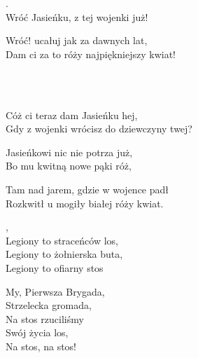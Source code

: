 \documentclass[a4paper,twoside,noinfo,nofrontmatter]{songbook}
\begin{document}
\begin{info}
    \lipsum[1]
\end{info}
  
  \begin{lyrics}[longestline={Gdy z wojenki wrócisz do dziewczyny twej?}]
    .\\
    Wróć Jasieńku, z tej wojenki już!\\    
    \begin{markverses}[marktext={powtórzcie to ludzie}]%
      Wróć! ucałuj jak za dawnych lat,\\
      Dam ci za to róży najpiękniejszy kwiat!
    \end{markverses}
    
    \\
    \\
    \begin{markverses}%
      Cóż ci teraz dam Jasieńku hej,\\
      Gdy z wojenki wrócisz do dziewczyny twej?
    \end{markverses}
    
    Jasieńkowi nic nie potrza już,\\
    Bo mu kwitną nowe pąki róż,\\
    \begin{markverses}%
      Tam nad jarem, gdzie w wojence padł\\
      Rozkwitł u mogiły białej róży kwiat.
    \end{markverses}
  \end{lyrics}


\begin{info}
    \lipsum[1]
\end{info}

  \begin{lyrics}[longestline=Legiony to straceńców los]
  , \\
  Legiony to straceńców los, \\
  Legiony to żołnierska buta, \\
  Legiony to ofiarny stos
  
  My, Pierwsza Brygada,\\
  Strzelecka gromada,\\
  Na stos rzuciliśmy\\
  Swój życia los,\\
  Na stos, na stos!
  \end{lyrics}

\end{document}
